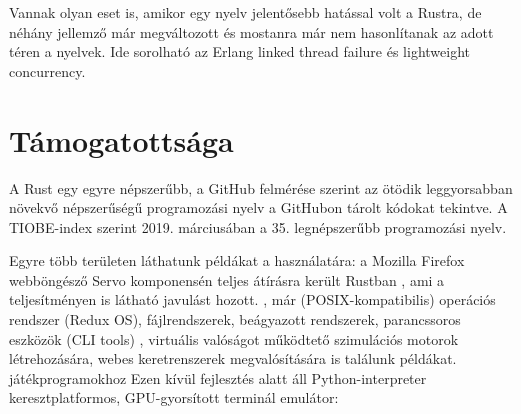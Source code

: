 Vannak olyan eset is, amikor egy nyelv jelentősebb hatással volt a Rustra, de néhány jellemző már megváltozott és mostanra már nem hasonlítanak az adott téren a nyelvek. Ide sorolható az Erlang linked thread failure és lightweight concurrency.

\section{Támogatottsága}
A Rust egy egyre népszerűbb, a GitHub felmérése szerint %
az ötödik leggyorsabban növekvő népszerűségű programozási nyelv a GitHubon tárolt kódokat tekintve. A TIOBE-index szerint %
2019. márciusában a 35. legnépszerűbb programozási nyelv.

Egyre több területen láthatunk példákat a használatára: a Mozilla Firefox webböngésző Servo komponensén teljes átírásra került Rustban
, ami a teljesítményen is látható javulást hozott. %
, már (POSIX-kompatibilis) operációs rendszer (Redux OS), fájlrendszerek, beágyazott rendszerek, parancssoros eszközök (CLI tools) %
, virtuális valóságot működtető szimulációs motorok létrehozására, webes keretrenszerek megvalósítására is találunk példákat. %
játékprogramokhoz %
Ezen kívül fejlesztés alatt áll Python-interpreter %
keresztplatformos, GPU-gyorsított terminál emulátor: %
